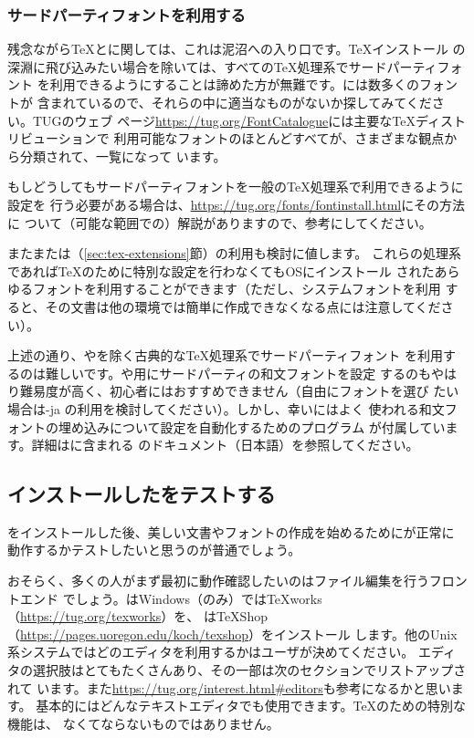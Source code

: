 \documentclass[uplatex,dvipdfmx,12pt,tombow]{jsarticle}
\begin{document}
\subsubsection{サードパーティフォントを利用する}

残念ながら\TeX と\pdfTeX に関しては、これは泥沼への入り口です。\TeX インストール
の深淵に飛び込みたい場合を除いては、すべての\TeX 処理系でサードパーティフォント
を利用できるようにすることは諦めた方が無難です。\TL には数多くのフォントが
含まれているので、それらの中に適当なものがないか探してみてください。TUGのウェブ
ページ\url{https://tug.org/FontCatalogue}には主要な\TeX ディストリビューションで
利用可能なフォントのほとんどすべてが、さまざまな観点から分類されて、一覧になって
います。

もしどうしてもサードパーティフォントを一般の\TeX 処理系で利用できるように設定を
行う必要がある場合は、\url{https://tug.org/fonts/fontinstall.html}にその方法に
ついて（可能な範囲での）解説がありますので、参考にしてください。

また\XeTeX または\LuaTeX （\ref{sec:tex-extensions}節）の利用も検討に値します。
これらの処理系であれば\TeX のために特別な設定を行わなくてもOSにインストール
されたあらゆるフォントを利用することができます（ただし、システムフォントを利用
すると、その文書は他の環境では簡単に作成できなくなる点には注意してください）。

\begin{janote}
上述の通り、\XeTeX や\LuaTeX を除く古典的な\TeX 処理系でサードパーティフォント
を利用するのは難しいです。\pTeX や\upTeX 用にサードパーティの和文フォントを設定
するのもやはり難易度が高く、初心者にはおすすめできません（自由にフォントを選び
たい場合は\LuaTeX-ja の利用を検討してください）。しかし、幸い\TL にはよく
使われる和文フォントの埋め込みについて設定を自動化するためのプログラム
が付属しています。詳細は\TL に含まれる
のドキュメント（日本語）を参照してください。
\end{janote}

\subsection{インストールした\TL をテストする}
\label{sec:test-install}

\TL をインストールした後、美しい文書やフォントの作成を始めるために\TL が正常に
動作するかテストしたいと思うのが普通でしょう。

おそらく、多くの人がまず最初に動作確認したいのはファイル編集を行うフロントエンド
でしょう。\TL はWindows（のみ）では{\TeX}works（\url{https://tug.org/texworks}）を、
\MacTeX は{\TeX}Shop（\url{https://pages.uoregon.edu/koch/texshop}）をインストール
します。他のUnix系システムではどのエディタを利用するかはユーザが決めてください。
エディタの選択肢はとてもたくさんあり、その一部は次のセクションでリストアップされて
います。また\url{https://tug.org/interest.html#editors}も参考になるかと思います。
基本的にはどんなテキストエディタでも使用できます。\TeX のための特別な機能は、
なくてならないものではありません。
\end{document}

